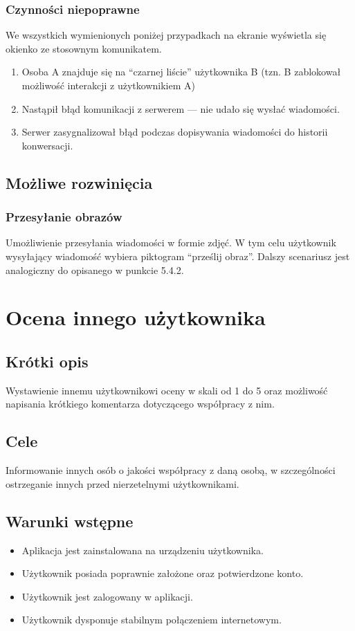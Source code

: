 \documentclass[12pt,a4paper,twoside]{article}
\begin{document}
    \subsubsection{Czynności niepoprawne}
    We wszystkich wymienionych poniżej przypadkach na ekranie wyświetla się okienko ze stosownym komunikatem.
    \begin{enumerate}
        \item Osoba A znajduje się na ``czarnej liście'' użytkownika B (tzn. B zablokował możliwość interakcji z użytkownikiem A)
        \item Nastąpił błąd komunikacji z serwerem --- nie udało się wysłać wiadomości.
        \item Serwer zasygnalizował błąd podczas dopisywania wiadomości do historii konwersacji.
    \end{enumerate}


    \subsection{Możliwe rozwinięcia}
    \subsubsection{Przesyłanie obrazów}
    Umożliwienie przesyłania wiadomości w formie zdjęć. W tym celu użytkownik wysyłający wiadomość wybiera piktogram ``prześlij obraz''. Dalszy scenariusz jest analogiczny do opisanego w punkcie 5.4.2.

    \section{Ocena innego użytkownika}

    \subsection{Krótki opis}
    Wystawienie innemu użytkownikowi oceny w skali od 1 do 5 oraz możliwość napisania krótkiego komentarza dotyczącego współpracy z nim.


    \subsection{Cele}
    Informowanie innych osób o jakości współpracy z daną osobą, w szczególności ostrzeganie innych przed nierzetelnymi użytkownikami.


    \subsection{Warunki wstępne}
    \begin{itemize}
        \item Aplikacja jest zainstalowana na urządzeniu użytkownika.
        \item Użytkownik posiada poprawnie założone oraz potwierdzone konto.
        \item Użytkownik jest zalogowany w aplikacji.
        \item Użytkownik dysponuje stabilnym połączeniem internetowym.
    \end{itemize}
\end{document}
